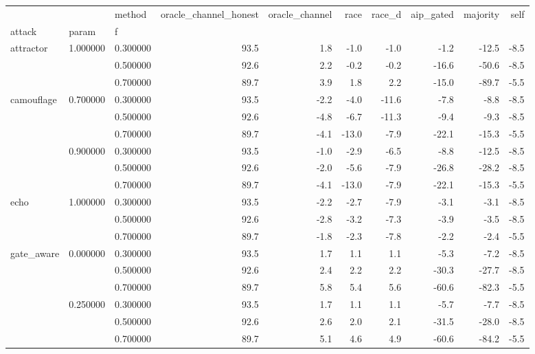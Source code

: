 \begin{tabular}{lllrrrrrrr}
\toprule
 &  & method & oracle\_channel\_honest & oracle\_channel & race & race\_d & aip\_gated & majority & self \\
attack & param & f &  &  &  &  &  &  &  \\
\midrule
\multirow[t]{3}{*}{attractor} & \multirow[t]{3}{*}{1.000000} & 0.300000 & 93.5 & 1.8 & -1.0 & -1.0 & -1.2 & -12.5 & -8.5 \\
 &  & 0.500000 & 92.6 & 2.2 & -0.2 & -0.2 & -16.6 & -50.6 & -8.5 \\
 &  & 0.700000 & 89.7 & 3.9 & 1.8 & 2.2 & -15.0 & -89.7 & -5.5 \\
\cline{1-10} \cline{2-10}
\multirow[t]{6}{*}{camouflage} & \multirow[t]{3}{*}{0.700000} & 0.300000 & 93.5 & -2.2 & -4.0 & -11.6 & -7.8 & -8.8 & -8.5 \\
 &  & 0.500000 & 92.6 & -4.8 & -6.7 & -11.3 & -9.4 & -9.3 & -8.5 \\
 &  & 0.700000 & 89.7 & -4.1 & -13.0 & -7.9 & -22.1 & -15.3 & -5.5 \\
\cline{2-10}
 & \multirow[t]{3}{*}{0.900000} & 0.300000 & 93.5 & -1.0 & -2.9 & -6.5 & -8.8 & -12.5 & -8.5 \\
 &  & 0.500000 & 92.6 & -2.0 & -5.6 & -7.9 & -26.8 & -28.2 & -8.5 \\
 &  & 0.700000 & 89.7 & -4.1 & -13.0 & -7.9 & -22.1 & -15.3 & -5.5 \\
\cline{1-10} \cline{2-10}
\multirow[t]{3}{*}{echo} & \multirow[t]{3}{*}{1.000000} & 0.300000 & 93.5 & -2.2 & -2.7 & -7.9 & -3.1 & -3.1 & -8.5 \\
 &  & 0.500000 & 92.6 & -2.8 & -3.2 & -7.3 & -3.9 & -3.5 & -8.5 \\
 &  & 0.700000 & 89.7 & -1.8 & -2.3 & -7.8 & -2.2 & -2.4 & -5.5 \\
\cline{1-10} \cline{2-10}
\multirow[t]{15}{*}{gate\_aware} & \multirow[t]{3}{*}{0.000000} & 0.300000 & 93.5 & 1.7 & 1.1 & 1.1 & -5.3 & -7.2 & -8.5 \\
 &  & 0.500000 & 92.6 & 2.4 & 2.2 & 2.2 & -30.3 & -27.7 & -8.5 \\
 &  & 0.700000 & 89.7 & 5.8 & 5.4 & 5.6 & -60.6 & -82.3 & -5.5 \\
\cline{2-10}
 & \multirow[t]{3}{*}{0.250000} & 0.300000 & 93.5 & 1.7 & 1.1 & 1.1 & -5.7 & -7.7 & -8.5 \\
 &  & 0.500000 & 92.6 & 2.6 & 2.0 & 2.1 & -31.5 & -28.0 & -8.5 \\
 &  & 0.700000 & 89.7 & 5.1 & 4.6 & 4.9 & -60.6 & -84.2 & -5.5 \\

\end{tabular}
